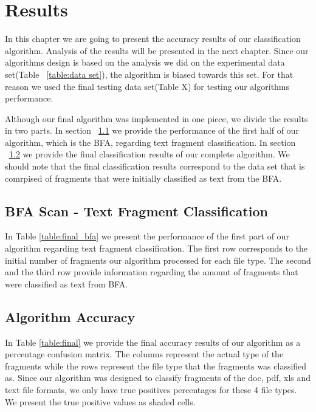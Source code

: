 \chapter{Results}\label{chap:6}
In this chapter we are going to present the accuracy results of our classification algorithm. Analysis of the results will be presented in the next chapter.
Since our algorithms design is based on the analysis we did on the experimental data set(Table ~\ref{table:data set}), the algorithm is biased towards this set. For that reason we used the final testing data set(Table X) for testing our algorithms performance.

Although our final algorithm was implemented in one piece, we divide the results in two parts. In section ~\ref{sec:6.1} we  provide the performance of the first half of our algorithm, which is the BFA, regarding text fragment classification. In section ~\ref{sec:6.2} we provide the final classification results of our complete algorithm. We should note that the final classification results correspond to the data set that is comrpised of fragments that were initially classified as text from the BFA.
\pagebreak

\section{BFA Scan - Text Fragment Classification}\label{sec:6.1}
In Table \ref{table:final_bfa} we present the performance of the first part of our algorithm regarding text fragment classification. The first row corresponds to the initial number of fragments our algorithm processed for each file type. The second and the third row provide information regarding the amount of fragments that were classified as text from BFA.





\section{Algorithm Accuracy}\label{sec:6.2}
In Table \ref{table:final} we provide the final accuracy results of our algorithm as a percentage confusion matrix. The columns represent the actual type of the fragments while the rows represent the file type that the fragments was classified as. Since our algorithm was designed to classify fragments of the doc, pdf, xls and text file formats, we only have true positives percentages for these 4 file types. We present the true positive values as shaded cells.

